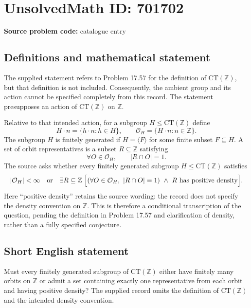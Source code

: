 \documentclass[11pt]{article}
\newcommand{\Z}{\mathbb{Z}}
\begin{document}
\section*{UnsolvedMath ID: 701702}
\textbf{Source problem code:} catalogue entry
\subsection{Definitions and mathematical statement}
The supplied statement refers to Problem 17.57 for the definition of \(\mathrm{CT}(\Z)\), but that definition is not included. Consequently, the ambient group and its action cannot be specified completely from this record. The statement presupposes an action of \(\mathrm{CT}(\Z)\) on \(\Z\).

Relative to that intended action, for a subgroup \(H\leq \mathrm{CT}(\Z)\) define
\[
H\cdot n=\{h\cdot n:h\in H\},\qquad
\mathcal O_H=\{H\cdot n:n\in\Z\}.
\]
The subgroup \(H\) is finitely generated if \(H=\langle F\rangle\) for some finite subset \(F\subseteq H\). A set of orbit representatives is a subset \(R\subseteq\Z\) satisfying
\[
\forall O\in\mathcal O_H,\qquad |R\cap O|=1.
\]
The source asks whether every finitely generated subgroup \(H\leq\mathrm{CT}(\Z)\) satisfies
\[
|\mathcal O_H|<\infty
\quad\text{or}\quad
\exists R\subseteq\Z\;\Bigl[
(\forall O\in\mathcal O_H,\ |R\cap O|=1)
\ \land\ R\text{ has positive density}\Bigr].
\]
Here ``positive density'' retains the source wording: the record does not specify the density convention on \(\Z\). This is therefore a conditional transcription of the question, pending the definition in Problem 17.57 and clarification of density, rather than a fully specified conjecture.
\subsection{Short English statement}
Must every finitely generated subgroup of \(\mathrm{CT}(\Z)\) either have finitely many orbits on \(\Z\) or admit a set containing exactly one representative from each orbit and having positive density? The supplied record omits the definition of \(\mathrm{CT}(\Z)\) and the intended density convention.
\end{document}
